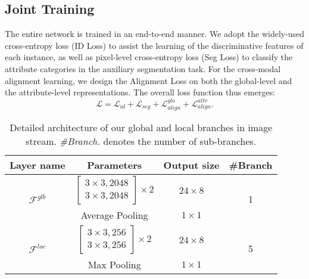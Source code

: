\documentclass[runningheads]{llncs}
\begin{document}
\subsection{Joint Training}
The entire network is trained in an end-to-end manner. We adopt the widely-used cross-entropy loss (ID Loss) to assist the learning of the discriminative features of each instance, as well as pixel-level cross-entropy loss (Seg Loss) to classify the attribute categories in the auxiliary segmentation task. For the cross-modal alignment learning, we design the Alignment Loss on both the global-level and the attribute-level representations. The overall loss function thus emerges:
\begin{equation}
\mathcal{L} = \mathcal{L}_{id} + \mathcal{L}_{seg} + \mathcal{L}_{align}^{glo} + \mathcal{L}_{align}^{attr}.
\tag{5}
\label{eq:5} 
\end{equation}


\begin{table}[t]
\caption{Detailed architecture of our global and local branches in image stream. \emph{\#Branch.} denotes the number of sub-branches.}
\begin{center}
\setlength{\tabcolsep}{7.5pt}
\begin{tabular}{c|c|c|c}
\toprule[1pt]
\multicolumn{1}{c|}{Layer name} & \multicolumn{1}{c|}{Parameters} & \multicolumn{1}{c|}{Output size} & \#Branch \\
\hline
 \multicolumn{1}{c|}{\multirow{3}[4]{*}{$\mathcal{F}^{glb}$}} & \multicolumn{1}{c|}{\multirow{2}[2]{*}{$\begin{bmatrix}3\times3,2048\\3\times3,2048\end{bmatrix}\times2$}} & \multicolumn{1}{c|}{\multirow{2}[2]{*}{$24\times8$}} & \multicolumn{1}{c}{\multirow{3}[4]{*}{1}} \bigstrut\\
\multicolumn{1}{c|}{} & \multicolumn{1}{c|}{} & \multicolumn{1}{c|}{} & \multicolumn{1}{c}{} \\
\cline{2-3}
\multicolumn{1}{c|}{} & Average Pooling & $1\times1$ & \bigstrut \\
\hline
 \multicolumn{1}{c|}{\multirow{3}[4]{*}{$\mathcal{F}^{loc}$}} & \multicolumn{1}{c|}{\multirow{2}[2]{*}{$\begin{bmatrix}3\times3,256\\3\times3,256\end{bmatrix}\times2$}} & \multicolumn{1}{c|}{\multirow{2}[2]{*}{$24\times8$}} & \multicolumn{1}{c}{\multirow{3}[4]{*}{5}} \bigstrut\\
\multicolumn{1}{c|}{} & \multicolumn{1}{c|}{} & \multicolumn{1}{c|}{} & \multicolumn{1}{c}{} \\
\cline{2-3}
\multicolumn{1}{c|}{} & Max Pooling & $1\times1$ & \bigstrut\\
\bottomrule[1pt]
\end{tabular}
\end{center}
\label{tab:head}
\end{table}
\end{document}
